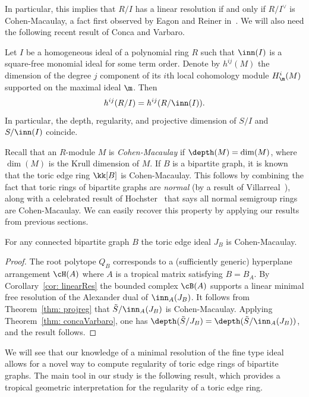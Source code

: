In particular, this implies that $R/I$ has a linear resolution if and only if $R/I^\vee$ is Cohen-Macaulay, a fact first observed by Eagon and Reiner in~\cite{eagon1998resolutions}. We will also need the following recent result of Conca and Varbaro.

\begin{theorem}\label{thm: concaVarbaro} Let $I$ be a homogeneous ideal of a polynomial ring $R$ such that $\inn(I)$ is a square-free monomial ideal for some term order. Denote by $h^{ij}(M)$ the dimension of the degree $j$ component of its $i$th local cohomology module $H^i_\m(M)$ supported on the maximal ideal $\m$. 
Then
$$
h^{ij}(R/I) = h^{ij}(R/\inn(I)).
$$
In particular, the depth, regularity, and projective dimension of $S/I$ and $S/\inn(I)$ coincide.
\end{theorem}

Recall that an $R$-module $M$ is \emph{Cohen-Macaulay} if $\depth(M) = \dim(M)$, where $\dim(M)$ is the Krull dimension of $M$. If $B$ is a bipartite graph, it is known that the toric edge ring $\kk[B]$ is Cohen-Macaulay. This follows by combining the fact that toric rings of bipartite graphs are \emph{normal} (by a result of Villarreal~\cite{villarreal1995rees}), along with a celebrated result of Hochster~\cite{hochster1972} that says all normal semigroup rings are Cohen-Macaulay.   
We can easily recover this property by applying our results from previous sections.

\begin{prop}\label{prop: CM} For any connected bipartite graph $B$ the toric edge ideal $J_B$ is Cohen-Macaulay.
\end{prop}

\begin{proof}
The root polytope $Q_B$ corresponds to a (sufficiently generic) hyperplane arrangement $\cH(A)$ where $A$ is a tropical matrix satisfying $B = B_A$.  By Corollary~\ref{cor: linearRes} the bounded complex $\cB(A)$ supports a linear minimal free resolution of the Alexander dual of $\inn_A(J_B)$. It follows from Theorem~\ref{thm: projreg} that $\tilde{S}/\inn_A(J_B)$ is Cohen-Macaulay. Applying Theorem~\ref{thm: concaVarbaro}, one has $\depth(\tilde{S}/J_B) = \depth(\tilde{S}/\inn_A(J_B))$, and the result follows.
\end{proof}

We will see that our knowledge of a minimal resolution of the fine type ideal allows for a novel way to compute regularity of toric edge rings of bipartite graphs. The main tool in our study is the following result, which provides a tropical geometric interpretation for the regularity of a toric edge ring.

